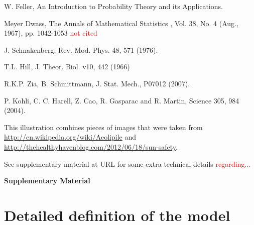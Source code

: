 \documentclass[aps,prl,floats,floatfix,twocolumn]{revtex4}
\newcommand{\rmrk}[1]{\textcolor{red}{#1}}
\begin{document}
\begin{thebibliography}{99}
W. Feller, 
An Introduction to Probability Theory and its Applications.

Meyer Dwass,
The Annals of Mathematical Statistics , Vol. 38, No. 4 (Aug., 1967), pp. 1042-1053
\rmrk{not cited}



J. Schnakenberg,
Rev. Mod. Phys. 48, 571 (1976).

T.L. Hill, 
J. Theor. Biol. v10, 442 (1966)

R.K.P. Zia, B. Schmittmann, 
J. Stat. Mech., P07012 (2007).

P. Kohli, C. C. Harell, Z. Cao, R. Gasparac and R. Martin, Science 305, 984 (2004).



This illustration combines pieces of images 
that were taken from \url{http://en.wikipedia.org/wiki/Aeolipile} 
and \url{http://thehealthyhavenblog.com/2012/06/18/sun-safety}.

See supplementary material at URL for some extra technical details \rmrk{regarding...}



\end{thebibliography}






\clearpage
\onecolumngrid

\begin{center}
{\LARGE\bf Supplementary Material}
\end{center}



\section{Detailed definition of the model}
\end{document}
